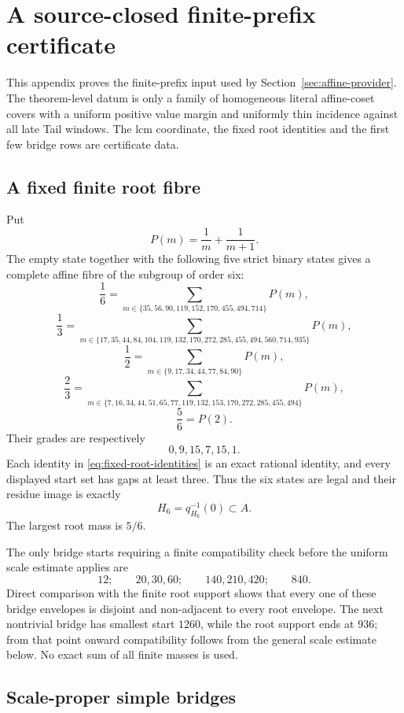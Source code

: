 \section{A source-closed finite-prefix certificate}
\label{app:source-closed-prefix}

This appendix proves the finite-prefix input used by
Section~\ref{sec:affine-provider}.  The theorem-level datum is only a family of
homogeneous literal affine-coset covers with a uniform positive value margin
and uniformly thin incidence against all late Tail windows.  The lcm
coordinate, the fixed root identities and the first few bridge rows are
certificate data.

\subsection{A fixed finite root fibre}

Put
\[
P(m)=\frac1m+\frac1{m+1}.
\]
The empty state together with the following five strict binary states gives a
complete affine fibre of the subgroup of order six:
\[
\frac16=
\sum_{m\in\{35,56,90,119,152,170,455,494,714\}}P(m),
\]
\[
\frac13=
\sum_{m\in\{17,35,44,84,104,119,132,170,272,285,455,494,560,714,935\}}P(m),
\]
\[
\frac12=
\sum_{m\in\{9,17,34,44,77,84,90\}}P(m),
\]
\[
\frac23=
\sum_{m\in\{7,16,34,44,51,65,77,119,132,153,170,272,285,455,494\}}P(m),
\]
\[
\frac56=P(2).
\tag{SC1}\label{eq:fixed-root-identities}
\]
Their grades are respectively
\[
0,9,15,7,15,1.
\tag{SC2}\label{eq:fixed-root-grades}
\]
Each identity in \eqref{eq:fixed-root-identities} is an exact rational
identity, and every displayed start set has gaps at least three.  Thus the six
states are legal and their residue image is exactly
\[
H_6=q_{H_6}^{-1}(0)\subset A.
\]
The largest root mass is $5/6$.

The only bridge starts requiring a finite compatibility check before the
uniform scale estimate applies are
\[
12;\qquad 20,30,60;\qquad 140,210,420;\qquad 840.
\tag{SC3}\label{eq:early-bridge-starts}
\]
Direct comparison with the finite root support shows that every one of these
bridge envelopes is disjoint and non-adjacent to every root envelope.  The
next nontrivial bridge has smallest start $1260$, while the root support ends
at $936$; from that point onward compatibility follows from the general scale
estimate below.  No exact sum of all finite masses is used.

\subsection{Scale-proper simple bridges}


